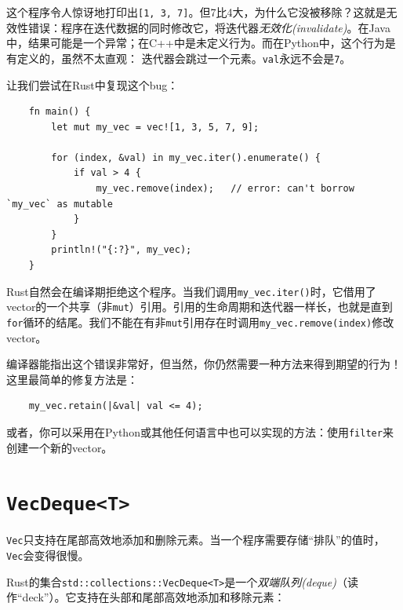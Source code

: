 这个程序令人惊讶地打印出\texttt{[1, 3, 7]}。但7比4大，为什么它没被移除？这就是无效性错误：程序在迭代数据的同时修改它，将迭代器\emph{无效化(invalidate)}。在Java中，结果可能是一个异常；在C++中是未定义行为。而在Python中，这个行为是有定义的，虽然不太直观：
迭代器会跳过一个元素。\texttt{val}永远不会是\texttt{7}。

让我们尝试在Rust中复现这个bug：
\begin{verbatim}
    fn main() {
        let mut my_vec = vec![1, 3, 5, 7, 9];
        
        for (index, &val) in my_vec.iter().enumerate() {
            if val > 4 {
                my_vec.remove(index);   // error: can't borrow `my_vec` as mutable
            }
        }
        println!("{:?}", my_vec);
    }
\end{verbatim}

Rust自然会在编译期拒绝这个程序。当我们调用\texttt{my\_vec.iter()}时，它借用了vector的一个共享（非\texttt{mut}）引用。引用的生命周期和迭代器一样长，也就是直到\texttt{for}循环的结尾。我们不能在有非\texttt{mut}引用存在时调用\texttt{my\_vec.remove(index)}修改vector。

编译器能指出这个错误非常好，但当然，你仍然需要一种方法来得到期望的行为！这里最简单的修复方法是：
\begin{verbatim}
    my_vec.retain(|&val| val <= 4);
\end{verbatim}

或者，你可以采用在Python或其他任何语言中也可以实现的方法：使用\texttt{filter}来创建一个新的vector。

\section{\texttt{VecDeque<T>}}

\texttt{Vec}只支持在尾部高效地添加和删除元素。当一个程序需要存储“排队”的值时，\texttt{Vec}会变得很慢。

Rust的集合\texttt{std::collections::VecDeque<T>}是一个\emph{双端队列(deque)}（读作“deck”）。它支持在头部和尾部高效地添加和移除元素：




